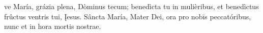 ve María, grázia plena, Dòminus tecum; benedìcta tu in mulièribus, et benedìctus frûctus ventris tui, Įesus. Sâncta María, Mater Dei, ora pro nobīs peccatóribus, nunc et in hora mortis nostrae.
